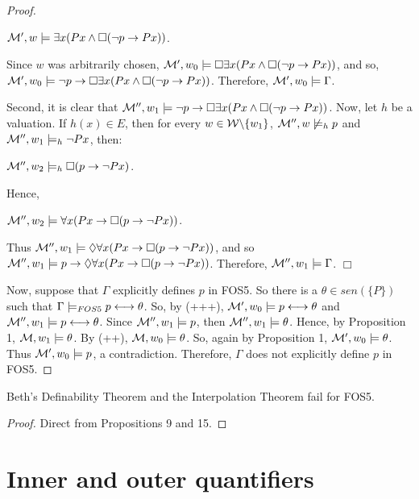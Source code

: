 \begin{proof}
\begin{center}
$\mathcal{M}^{\prime},w\models \exists x (Px \wedge \Box(\neg p \rightarrow Px))$.
\end{center}

\qquad Since $w$ was arbitrarily chosen, $\mathcal{M}^{\prime},w_{0}\models \Box \exists x (Px \wedge \Box(\neg p \rightarrow Px))$, and so, $\mathcal{M}^{\prime},w_{0}\models \neg p \rightarrow \Box \exists x (Px \wedge \Box(\neg p \rightarrow Px))$. Therefore, $\mathcal{M}^{\prime},w_{0} \models \Gamma$.  

\qquad Second, it is clear that $\mathcal{M}^{\prime\prime},w_{1} \models \neg p \rightarrow \Box \exists x (Px \wedge \Box (\neg p \rightarrow Px))$. Now, let $h$ be a valuation. If $h(x) \in E$, then for every $w \in \mathcal{W} \backslash \{w_1\}$, $\mathcal{M}^{\prime\prime},w \not\models_{h} p$ and $\mathcal{M}^{\prime\prime},w_{1} \models_{h} \neg Px$, then: 

\begin{center}
$\mathcal{M}^{\prime\prime},w_{2}\models_{h} \Box(p \rightarrow \neg Px)$.
\end{center}

\qquad Hence, 

\begin{center}
$\mathcal{M}^{\prime\prime},w_{2}\models \forall x (Px \rightarrow \Box(p \rightarrow \neg Px))$.
\end{center}

\qquad Thus $\mathcal{M}^{\prime\prime},w_{1}\models \Diamond \forall x (Px \rightarrow \Box(p \rightarrow \neg Px))$, and so $\mathcal{M}^{\prime\prime},w_{1}\models p \rightarrow \Diamond \forall x (Px \rightarrow \Box(p \rightarrow \neg Px))$. Therefore, $\mathcal{M}^{\prime\prime},w_{1} \models \Gamma$. $\Box$ 


\qquad Now, suppose that $\Gamma$ explicitly defines $p$ in FOS5. So there is a $\theta \in sen(\{P\})$ such that $\Gamma \models_{FOS5} p \longleftrightarrow \theta$. So, by (+++), $\mathcal{M}^{\prime},w_{0} \models p \longleftrightarrow \theta$ and $\mathcal{M}^{\prime\prime},w_{1} \models p \longleftrightarrow \theta$. Since $\mathcal{M}^{\prime\prime},w_{1} \models p$, then $\mathcal{M}^{\prime\prime},w_{1} \models \theta$. Hence, by Proposition 1, $\mathcal{M},w_{1} \models \theta$. By (++), $\mathcal{M},w_{0} \models \theta$. So, again by Proposition 1, $\mathcal{M}^{\prime},w_{0} \models \theta$. Thus $\mathcal{M}^{\prime},w_{0} \models p$, a contradiction. Therefore, $\Gamma$ does not explicitly define $p$ in FOS5.
\end{proof}

\begin{teor}
Beth's Definability Theorem and the Interpolation Theorem fail for FOS5. 
\end{teor}

\begin{proof}
Direct from Propositions 9 and 15.  
\end{proof}

\section{Inner and outer quantifiers}

